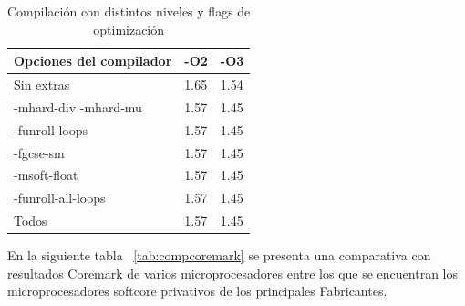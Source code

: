 \begin{table}[h!]
\begin{center}
\begin{tabular}{ |l |l| l|}
\hline
\rowcolor[gray]{0.8} Opciones del compilador&-O2&-O3 \\
\hline
Sin extras 					&1.65 			&1.54\\
\hline
-mhard-div -mhard-mu 		& 1.57			&1.45\\
\hline
-funroll-loops			 	& 1.57			& 1.45 \\
\hline
-fgcse-sm					& 1.57			& 1.45\\
\hline
-msoft-float 				& 1.57			&1.45 \\
\hline
-funroll-all-loops	 		& 1.57			& 1.45 \\
\hline
Todos	 					& 1.57			& 1.45 \\
\hline
\end{tabular}
\end{center}
\caption{Compilación con distintos niveles y flags de optimización}
\end{table}

En la siguiente tabla ~\ref{tab:compcoremark} se presenta una comparativa con resultados Coremark de varios microprocesadores entre los que se
encuentran los microprocesadores softcore privativos de los principales Fabricantes.

